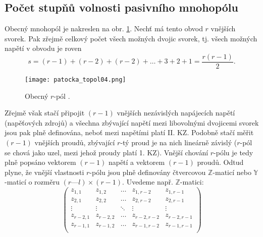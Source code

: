     \subsection{Počet stupňů volnosti pasivního mnohopólu}\label{teo:IchapIIsecIsubIV}
      Obecný mnohopól je nakreslen na obr. \ref{es:fig_patocka_topol04}. Nechť má tento obvod \(r\) 
      vnějších svorek. Pak zřejmě celkový počet všech možných dvojic svorek, tj. všech možných 
      napětí v obvodu je roven
      \begin{equation}\label{ES:eq_topol07}
        s=(r-1) + (r-2) + (r-2) + \ldots + 3 + 2 + 1 = \frac{r(r-1)}{2}.
      \end{equation}
      \begin{figure}[ht!]   %
        \centering
        \texttt{[image: patocka\_topol04.png]}
        \caption{Obecný \(r\)-pól \cite[s.~46]{Patocka4}.}
        \label{es:fig_patocka_topol04}
      \end{figure}
      Zřejmě však stačí připojit \((r-1)\) vnějších nezávislých napájecích napětí (napěťových 
      zdrojů) a všechna zbývající napětí mezi libovolnými dvojicemi svorek jsou pak plně 
      definována, neboť mezi napětími platí II. KZ. Podobně stačí měřit \((r-1)\) vnějších proudů, 
      zbývající \(r\)-tý proud je na nich lineárně závislý (\(r\)-pól se chová jako uzel, mezi 
      jehož proudy platí 1. KZ). Vnější chování \(r\)-pólu je tedy plně popsáno vektorem \((r-1)\) 
      napětí a vektorem \((r-1)\) proudů. Odtud plyne, že vnější vlastnosti \(r\)-pólu jsou plně 
      definovány čtvercovou \(\mathbb{Z}\)-maticí nebo \(\mathbb{Y}\)-maticí o rozměru 
      \((r—l)\times(r-1)\). Uvedeme např. \(\mathbb{Z}\)-matici:  
      \begin{equation}\label{ES:eq_topol08}
        \left(
          \begin{array}{ccccc}
            z_{1,1}    &  z_{1,2}   & \ldots & z_{1,r-2}   & z_{1,r-1}    \\
            z_{2,1}    &  z_{2,2}   & \ldots & z_{2,r-2}   & z_{2,r-1}    \\
            \vdots     &  \vdots    & \ddots & \vdots      &\vdots        \\
            z_{r-2,1}  &  z_{r-2,2} & \ldots & z_{r-2,r-2} & z_{r-2,r-1}  \\
            z_{r-1,1}  &  z_{r-1,2} & \ldots & z_{r-1,r-2} & z_{r-1,r-1}  \\
          \end{array}
        \right)
      \end{equation}
      
